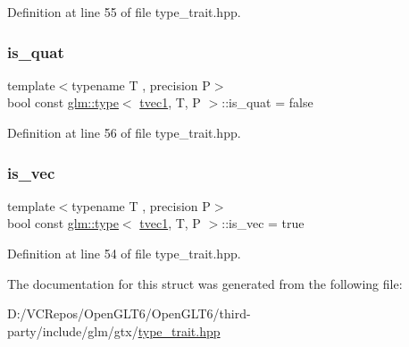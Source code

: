 Definition at line 55 of file type\+\_\+trait.\+hpp.

\mbox{\label{structglm_1_1type_3_01tvec1_00_01_t_00_01_p_01_4_af558f7c8789d4153d3a859e75aa76040}} 
\subsubsection{\texorpdfstring{is\_quat}{is\_quat}}
{\footnotesize\ttfamily template$<$typename T , precision P$>$ \\
bool const \mbox{\hyperlink{structglm_1_1type}{glm\+::type}}$<$ \mbox{\hyperlink{structglm_1_1tvec1}{tvec1}}, T, P $>$\+::is\+\_\+quat = false\hspace{0.3cm}{\ttfamily [static]}}



Definition at line 56 of file type\+\_\+trait.\+hpp.

\mbox{\label{structglm_1_1type_3_01tvec1_00_01_t_00_01_p_01_4_adbc01bdae03ced483f6879a6c480f0fa}} 
\subsubsection{\texorpdfstring{is\_vec}{is\_vec}}
{\footnotesize\ttfamily template$<$typename T , precision P$>$ \\
bool const \mbox{\hyperlink{structglm_1_1type}{glm\+::type}}$<$ \mbox{\hyperlink{structglm_1_1tvec1}{tvec1}}, T, P $>$\+::is\+\_\+vec = true\hspace{0.3cm}{\ttfamily [static]}}



Definition at line 54 of file type\+\_\+trait.\+hpp.



The documentation for this struct was generated from the following file\+:\begin{DoxyCompactItemize}
\item 
D\+:/\+V\+C\+Repos/\+Open\+G\+L\+T6/\+Open\+G\+L\+T6/third-\/party/include/glm/gtx/\mbox{\hyperlink{type__trait_8hpp}{type\+\_\+trait.\+hpp}}\end{DoxyCompactItemize}
